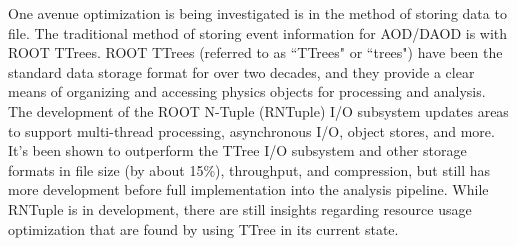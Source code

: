 One avenue optimization is being investigated is in the method of storing data to file.
The traditional method of storing event information for AOD/DAOD is with ROOT TTrees.
ROOT TTrees (referred to as ``TTrees" or ``trees") have been the standard data storage format for over two decades, and they provide a clear means of organizing and accessing physics objects for processing and analysis.
The development of the ROOT N-Tuple (RNTuple) I/O subsystem updates areas to support multi-thread processing, asynchronous I/O, object stores, and more.
It's been shown to outperform the TTree I/O subsystem and other storage formats in file size (by about 15\%), throughput, and compression, but still has more development before full implementation into the analysis pipeline.\cite{RNTuple_Lopez-Gomez_2023}\cite{RNTuple_Blomer}
While RNTuple is in development, there are still insights regarding resource usage optimization that are found by using TTree in its current state. 

